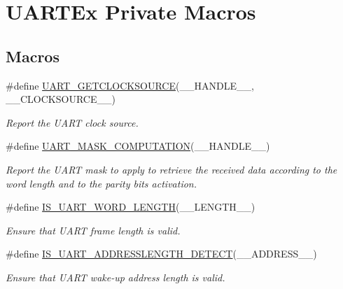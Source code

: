 \hypertarget{group___u_a_r_t_ex___private___macros}{}\section{U\+A\+R\+T\+Ex Private Macros}
\label{group___u_a_r_t_ex___private___macros}
\subsection*{Macros}
\begin{DoxyCompactItemize}
\item 
\#define \mbox{\hyperlink{group___u_a_r_t_ex___private___macros_ga2d8ffd4cb12754846ace609dff92e8df}{U\+A\+R\+T\+\_\+\+G\+E\+T\+C\+L\+O\+C\+K\+S\+O\+U\+R\+CE}}(\+\_\+\+\_\+\+H\+A\+N\+D\+L\+E\+\_\+\+\_\+,  \+\_\+\+\_\+\+C\+L\+O\+C\+K\+S\+O\+U\+R\+C\+E\+\_\+\+\_\+)
\begin{DoxyCompactList}\small\item\em Report the U\+A\+RT clock source. \end{DoxyCompactList}\item 
\#define \mbox{\hyperlink{group___u_a_r_t_ex___private___macros_gad9330184a8bd9399a36bcc93215a50d1}{U\+A\+R\+T\+\_\+\+M\+A\+S\+K\+\_\+\+C\+O\+M\+P\+U\+T\+A\+T\+I\+ON}}(\+\_\+\+\_\+\+H\+A\+N\+D\+L\+E\+\_\+\+\_\+)
\begin{DoxyCompactList}\small\item\em Report the U\+A\+RT mask to apply to retrieve the received data according to the word length and to the parity bits activation. \end{DoxyCompactList}\item 
\#define \mbox{\hyperlink{group___u_a_r_t_ex___private___macros_gaf856254e5a61d2ee81086918bffabde5}{I\+S\+\_\+\+U\+A\+R\+T\+\_\+\+W\+O\+R\+D\+\_\+\+L\+E\+N\+G\+TH}}(\+\_\+\+\_\+\+L\+E\+N\+G\+T\+H\+\_\+\+\_\+)
\begin{DoxyCompactList}\small\item\em Ensure that U\+A\+RT frame length is valid. \end{DoxyCompactList}\item 
\#define \mbox{\hyperlink{group___u_a_r_t_ex___private___macros_gaa4cf2a15ad7ae46e2905debeef35a908}{I\+S\+\_\+\+U\+A\+R\+T\+\_\+\+A\+D\+D\+R\+E\+S\+S\+L\+E\+N\+G\+T\+H\+\_\+\+D\+E\+T\+E\+CT}}(\+\_\+\+\_\+\+A\+D\+D\+R\+E\+S\+S\+\_\+\+\_\+)
\begin{DoxyCompactList}\small\item\em Ensure that U\+A\+RT wake-\/up address length is valid. \end{DoxyCompactList}\end{DoxyCompactItemize}


